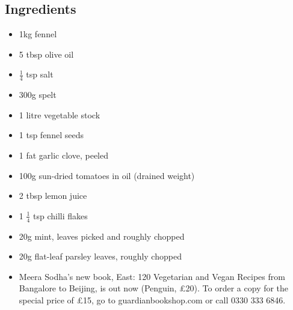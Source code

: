 \documentclass{book}
\begin{document}
\subsection*{Ingredients}
\begin{itemize}
\item 1kg fennel
\item 5 tbsp olive oil 
\item $\frac{1}{4}$ tsp salt 
\item 300g spelt
\item 1 litre vegetable stock 
\item 1 tsp fennel seeds
\item 1 fat garlic clove, peeled
\item 100g sun-dried tomatoes in oil (drained weight)
\item 2 tbsp lemon juice
\item 1 $\frac{1}{4}$ tsp chilli flakes
\item 20g mint, leaves picked and roughly chopped
\item 20g flat-leaf parsley leaves, roughly chopped
\end{itemize}

\begin{itemize}
\item Meera Sodha’s new book, East: 120 Vegetarian and Vegan Recipes from Bangalore to Beijing, is out now (Penguin, £20). To order a copy for the special price of £15, go to guardianbookshop.com or call 0330 333 6846.
\end{itemize}
\end{document}
